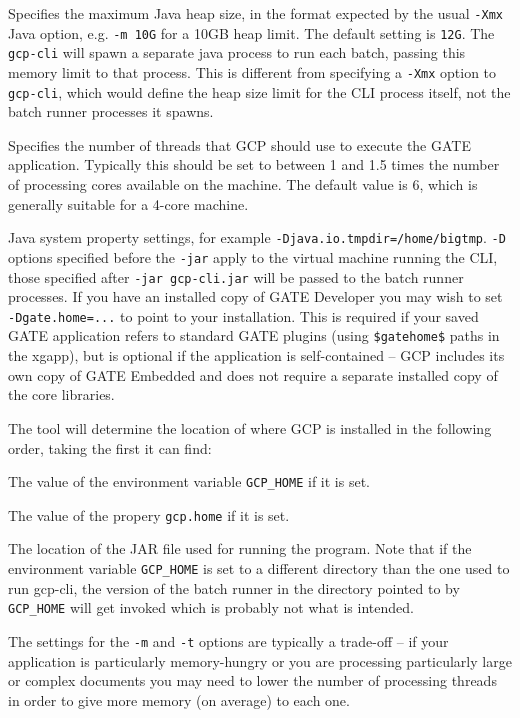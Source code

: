 \bde
\item[-m] Specifies the maximum Java heap size, in the format expected by the
  usual \verb!-Xmx! Java option, e.g. \verb!-m 10G! for a 10GB heap limit.  The
  default setting is \verb!12G!.  The \verb!gcp-cli! will spawn a separate java
  process to run each batch, passing this memory limit to that process.  This
  is different from specifying a \verb!-Xmx! option to \verb!gcp-cli!, which
  would define the heap size limit for the CLI process itself, not the batch
  runner processes it spawns.
\item[-t] Specifies the number of threads that GCP should use to execute the
  GATE application.  Typically this should be set to between 1 and 1.5 times
  the number of processing cores available on the machine.  The default value
  is 6, which is generally suitable for a 4-core machine.
\item[-D] Java system property settings, for example
  \verb!-Djava.io.tmpdir=/home/bigtmp!.  \verb!-D! options specified before the
  \verb!-jar! apply to the virtual machine running the CLI, those specified
  after \verb!-jar gcp-cli.jar! will be passed to the batch runner processes.
  If you have an installed copy of GATE Developer you may wish to set
  \verb!-Dgate.home=...! to point to your installation.  This is required if
  your saved GATE application refers to standard GATE plugins (using
  \verb!$gatehome$! paths in the xgapp), but is optional if the application is
  self-contained -- GCP includes its own copy of GATE Embedded and does not
  require a separate installed copy of the core libraries.
\ede

The tool will determine the location of where GCP is installed in the 
following order, taking the first it can find:
\ben
\item The value of the environment variable \verb!GCP_HOME! if it is set.
\item The value of the propery  \verb!gcp.home! if it is set.
\item The location of the JAR file used for running the program.
\een
Note that if the environment variable \verb!GCP_HOME! is set to a different
directory than the one used to run gcp-cli, the version of 
the batch runner in the directory pointed to by \verb!GCP_HOME! will get invoked
which is probably not what is intended.

The settings for the \verb!-m! and \verb!-t! options are typically a trade-off
-- if your application is particularly memory-hungry or you are processing
particularly large or complex documents you may need to lower the number of
processing threads in order to give more memory (on average) to each one.

